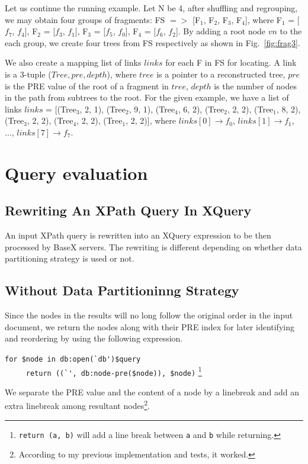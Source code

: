 Let us continue the running example. Let N be 4, after shuffling and regrouping,
we may obtain four groups of fragments: FS $=>$ [F$_1$, F$_2$, F$_3$, F$_4$], where
F$_1$ = [$f_7$, $f_4$],
F$_2$ = [$f_3$, $f_1$],
F$_3$ = [$f_5$, $f_0$],
F$_4$ = [$f_6$, $f_2$].
By adding a root node $vn$ to the each group, we create four trees from FS
respectively as shown in Fig.~\ref{fig:frag3}.

We also create a mapping list of links $links$ for each F in FS for locating.
A link is a 3-tuple ($Tree,
pre, depth$), where $tree$ is a pointer to a reconstructed tree, $pre$ is the PRE
value of the root of a fragment in $tree$, $depth$ is the number of nodes in the
path from subtrees to the root. For the given example, we have a list of links
$links$ =
[(Tree$_3$, 2, 1),
(Tree$_2$, 9, 1),
(Tree$_4$, 6, 2),
(Tree$_2$, 2, 2),
(Tree$_1$, 8, 2),
(Tree$_3$, 2, 2),
(Tree$_4$, 2, 2),
(Tree$_1$, 2, 2)],
where $links[0] \rightarrow f_0$, $links[1] \rightarrow f_1$, ...,  $links[7]
\rightarrow f_7$.

\section{Query evaluation}

\subsection{Rewriting An XPath Query In XQuery}

An input XPath query is rewritten into an XQuery expression to be then processed
by BaseX servers. The rewriting is different depending on whether data
partitioning strategy is used or not.

\subsection{Without Data Partitioninng Strategy}
\label{no-dps}

Since the nodes in the results will no long follow the original order in the
input document, we return the nodes along with their PRE index for later
identifying and reordering by using the following expression.

\verb|for $node in db:open(`db')$query|\\
\verb|     return ((`', db:node-pre($node)), $node)|
\footnote{\texttt{return (a, b)} will add a line break between \texttt{a} and
	\texttt{b} while returning.}

We separate the PRE value and the content of a node by a linebreak and add an
extra linebreak among resultant nodes\footnote{According to my previous
	implementation and tests, it worked.}.


